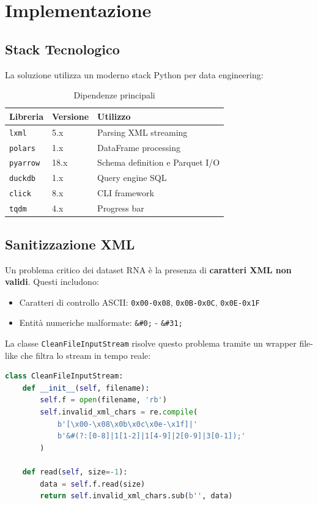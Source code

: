 \chapter{Implementazione}

\section{Stack Tecnologico}

La soluzione utilizza un moderno stack Python per data engineering:

\begin{table}[h]
\centering
\begin{tabular}{@{}llp{6cm}@{}}
\toprule
\textbf{Libreria} & \textbf{Versione} & \textbf{Utilizzo} \\
\midrule
\texttt{lxml} & 5.x & Parsing XML streaming \\
\texttt{polars} & 1.x & DataFrame processing \\
\texttt{pyarrow} & 18.x & Schema definition e Parquet I/O \\
\texttt{duckdb} & 1.x & Query engine SQL \\
\texttt{click} & 8.x & CLI framework \\
\texttt{tqdm} & 4.x & Progress bar \\
\bottomrule
\end{tabular}
\caption{Dipendenze principali}
\end{table}

\section{Sanitizzazione XML}

Un problema critico dei dataset RNA è la presenza di \textbf{caratteri XML non validi}. Questi includono:

\begin{itemize}
    \item Caratteri di controllo ASCII: \texttt{0x00-0x08}, \texttt{0x0B-0x0C}, \texttt{0x0E-0x1F}
    \item Entità numeriche malformate: \texttt{\&\#0;} - \texttt{\&\#31;}
\end{itemize}

La classe \texttt{CleanFileInputStream} risolve questo problema tramite un wrapper file-like che filtra lo stream in tempo reale:

\begin{lstlisting}[language=Python, caption=Sanitizzazione streaming]
class CleanFileInputStream:
    def __init__(self, filename):
        self.f = open(filename, 'rb')
        self.invalid_xml_chars = re.compile(
            b'[\x00-\x08\x0b\x0c\x0e-\x1f]|'
            b'&#(?:[0-8]|1[1-2]|1[4-9]|2[0-9]|3[0-1]);'
        )

    def read(self, size=-1):
        data = self.f.read(size)
        return self.invalid_xml_chars.sub(b'', data)
\end{lstlisting}

